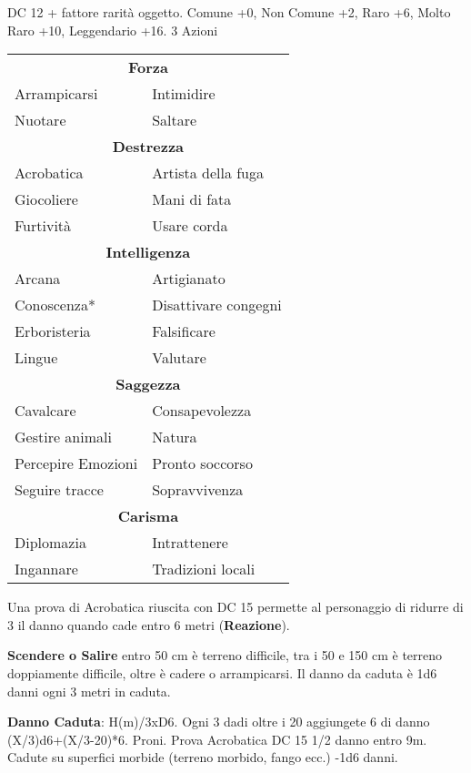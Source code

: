 \documentclass[landscape,10pt,a4paper]{article}
\begin{document}
\begin{multicols}{3}
\begin{dmbox}[title=Valutare - pagina \pageref{valutare}]
DC 12 + fattore rarità oggetto. Comune +0, Non Comune +2, Raro +6, Molto Raro +10, Leggendario +16. 3 Azioni
\end{dmbox}


\begin{dmbox}[title=Competenze - pagina \pageref{competenzeelenco}]
\begin{tabularx}{0.95\linewidth}{ll}
\multicolumn{2}{c}{\textbf{Forza}}\\
Arrampicarsi & Intimidire\\
Nuotare& Saltare\\
\multicolumn{2}{c}{\textbf{Destrezza}}\\
Acrobatica & Artista della fuga\\
Giocoliere & Mani di fata\\
Furtività & Usare corda\\
\multicolumn{2}{c}{\textbf{Intelligenza}}\\
Arcana &Artigianato\\
Conoscenza*&Disattivare congegni\\
Erboristeria&Falsificare\\
Lingue&Valutare\\
\multicolumn{2}{c}{\textbf{Saggezza}}\\
Cavalcare &Consapevolezza\\
Gestire animali&Natura\\
Percepire Emozioni&Pronto soccorso\\
Seguire tracce&Sopravvivenza\\
\multicolumn{2}{c}{\textbf{Carisma}}\\
Diplomazia &Intrattenere\\
Ingannare &Tradizioni locali
\end{tabularx}
\end{dmbox}


\begin{dmbox}[title=Acrobatica - pagina \pageref{acrobatica}]
Una prova di Acrobatica riuscita con DC 15 permette al personaggio di ridurre di 3 il danno quando cade entro 6 metri (\textbf{Reazione}).

\textbf{Scendere o Salire} entro 50 cm è terreno difficile, tra i 50 e 150 cm è terreno doppiamente difficile, oltre è cadere o arrampicarsi. Il danno da caduta è 1d6 danni ogni 3 metri in caduta. 

\textbf{Danno Caduta}: H(m)/3xD6. Ogni 3 dadi oltre i 20 aggiungete 6 di danno (X/3)d6+(X/3-20)*6. Proni. Prova Acrobatica DC 15 1/2 danno entro 9m.  Cadute su superfici morbide (terreno morbido, fango ecc.) -1d6 danni.
\end{dmbox}


\end{multicols}
\end{document}
